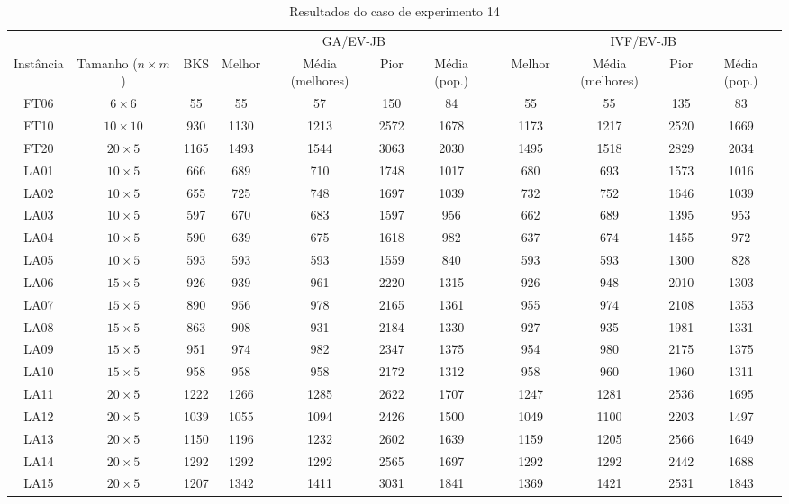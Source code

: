 \begin{sidewaystable}
\caption{Resultados do caso de experimento 14}
\centering
\label{experimento14}
\begin{tabular}{cccccccccccc}
\toprule
& & & \multicolumn{4}{c}{GA/EV-JB} & & \multicolumn{4}{c}{IVF/EV-JB} \\
\cmidrule(c){4-7}
\cmidrule(c){9-12}
Inst\^{a}ncia & Tamanho ($n \times m$) & BKS & Melhor & M\'{e}dia (melhores) & Pior & M\'{e}dia (pop.) & & Melhor & M\'{e}dia (melhores) & Pior & M\'{e}dia (pop.) \\
\midrule
FT06 & $6 \times 6$ & 55 & 55 & 57 & 150 & 84 & & 55 & 55 & 135 & 83 \\
FT10 & $10 \times 10$ & 930 & 1130 & 1213 & 2572 & 1678 & & 1173 & 1217 & 2520 & 1669 \\
FT20 & $20 \times 5$ & 1165 & 1493 & 1544 & 3063 & 2030 & & 1495 & 1518 & 2829 & 2034 \\
LA01 & $10 \times 5$ & 666 & 689 & 710 & 1748 & 1017 & & 680 & 693 & 1573 & 1016 \\
LA02 & $10 \times 5$ & 655 & 725 & 748 & 1697 & 1039 & & 732 & 752 & 1646 & 1039 \\
LA03 & $10 \times 5$ & 597 & 670 & 683 & 1597 & 956 & & 662 & 689 & 1395 & 953 \\
LA04 & $10 \times 5$ & 590 & 639 & 675 & 1618 & 982 & & 637 & 674 & 1455 & 972 \\
LA05 & $10 \times 5$ & 593 & 593 & 593 & 1559 & 840 & & 593 & 593 & 1300 & 828 \\
LA06 & $15 \times 5$ & 926 & 939 & 961 & 2220 & 1315 & & 926 & 948 & 2010 & 1303 \\
LA07 & $15 \times 5$ & 890 & 956 & 978 & 2165 & 1361 & & 955 & 974 & 2108 & 1353 \\
LA08 & $15 \times 5$ & 863 & 908 & 931 & 2184 & 1330 & & 927 & 935 & 1981 & 1331 \\
LA09 & $15 \times 5$ & 951 & 974 & 982 & 2347 & 1375 & & 954 & 980 & 2175 & 1375 \\
LA10 & $15 \times 5$ & 958 & 958 & 958 & 2172 & 1312 & & 958 & 960 & 1960 & 1311 \\
LA11 & $20 \times 5$ & 1222 & 1266 & 1285 & 2622 & 1707 & & 1247 & 1281 & 2536 & 1695 \\
LA12 & $20 \times 5$ & 1039 & 1055 & 1094 & 2426 & 1500 & & 1049 & 1100 & 2203 & 1497 \\
LA13 & $20 \times 5$ & 1150 & 1196 & 1232 & 2602 & 1639 & & 1159 & 1205 & 2566 & 1649 \\
LA14 & $20 \times 5$ & 1292 & 1292 & 1292 & 2565 & 1697 & & 1292 & 1292 & 2442 & 1688 \\
LA15 & $20 \times 5$ & 1207 & 1342 & 1411 & 3031 & 1841 & & 1369 & 1421 & 2531 & 1843 \\
\bottomrule
\end{tabular}
\end{sidewaystable}
